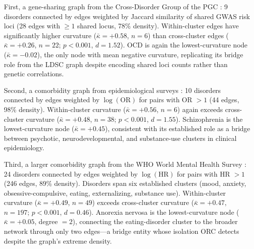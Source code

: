 \documentclass[11pt]{article}
\begin{document}
First, a gene-sharing graph from the Cross-Disorder Group of the PGC \citep{crossdisorder2019genomic}: 9 disorders connected by edges weighted by Jaccard similarity of shared GWAS risk loci (28 edges with $\geq 1$ shared locus, 78\% density). Within-cluster edges have significantly higher curvature ($\bar{\kappa} = +0.58$, $n = 6$) than cross-cluster edges ($\bar{\kappa} = +0.26$, $n = 22$; $p < 0.001$, $d = 1.52$). OCD is again the lowest-curvature node ($\bar{\kappa} = -0.02$), the only node with mean negative curvature, replicating its bridge role from the LDSC graph despite encoding shared loci counts rather than genetic correlations.

Second, a comorbidity graph from epidemiological surveys \citep{kessler2005prevalence, merikangas2011prevalence}: 10 disorders connected by edges weighted by $\log(\text{OR})$ for pairs with OR $> 1$ (44 edges, 98\% density). Within-cluster curvature ($\bar{\kappa} = +0.56$, $n = 6$) again exceeds cross-cluster curvature ($\bar{\kappa} = +0.48$, $n = 38$; $p < 0.001$, $d = 1.55$). Schizophrenia is the lowest-curvature node ($\bar{\kappa} = +0.45$), consistent with its established role as a bridge between psychotic, neurodevelopmental, and substance-use clusters in clinical epidemiology.

Third, a larger comorbidity graph from the WHO World Mental Health Survey \citep{mcgrath2020comorbidity}: 24 disorders connected by edges weighted by $\log(\text{HR})$ for pairs with HR $> 1$ (246 edges, 89\% density). Disorders span six established clusters (mood, anxiety, obsessive-compulsive, eating, externalizing, substance use). Within-cluster curvature ($\bar{\kappa} = +0.49$, $n = 49$) exceeds cross-cluster curvature ($\bar{\kappa} = +0.47$, $n = 197$; $p < 0.001$, $d = 0.46$). Anorexia nervosa is the lowest-curvature node ($\bar{\kappa} = +0.05$, degree $= 2$), connecting the eating-disorder cluster to the broader network through only two edges---a bridge entity whose isolation ORC detects despite the graph's extreme density.
\end{document}
